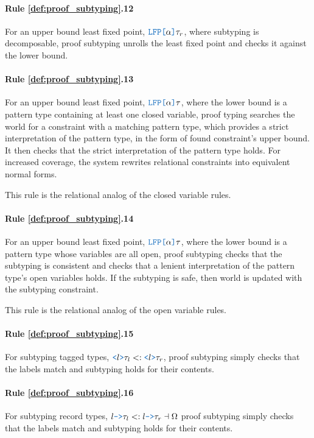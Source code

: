 \documentclass[acmsmall]{acmart}
\theoremstyle{definition}
\begin{document}
\paragraph{Rule \ref{def:proof_subtyping}.12}
For an upper bound least fixed point, $\obj{LFP[} \alpha \obj{]} \tau_r$, 
where subtyping is decomposable, proof subtyping   
unrolls the least fixed point and checks it against the lower bound. 

\paragraph{Rule \ref{def:proof_subtyping}.13}
For an upper bound least fixed point, $\obj{LFP[} \alpha \obj{]} \tau$, 
where the lower bound is a pattern type containing at least one closed variable,
proof typing searches the world for a constraint with a matching pattern type,
which provides a strict interpretation of the pattern type,
in the form of found constraint's upper bound.
It then checks that the strict interpretation of the pattern type holds.
For increased coverage, the system rewrites relational constraints
into equivalent normal forms.

This rule is the relational analog of the closed variable rules.

\paragraph{Rule \ref{def:proof_subtyping}.14}
For an upper bound least fixed point, $\obj{LFP[} \alpha \obj{]} \tau$, 
where the lower bound is a pattern type whose variables are all open,
proof subtyping checks that the subtyping is consistent
and checks that a lenient interpretation of the pattern type's open variables
holds. If the subtyping is safe, then world is updated
with the subtyping constraint. 

This rule is the relational analog of the open variable rules.

\paragraph{Rule \ref{def:proof_subtyping}.15}
For subtyping tagged types, $\obj{<}l \obj{>} \tau_l \subtypes \obj{<} l \obj{>} \tau_r$, 
proof subtyping simply checks that the labels match and subtyping holds
for their contents.


\paragraph{Rule \ref{def:proof_subtyping}.16}
For subtyping record types, $l \obj{->} \tau_l \subtypes l \obj{->} \tau_r \given \Omega$
proof subtyping simply checks that the labels match and subtyping holds
for their contents.
\end{document}
